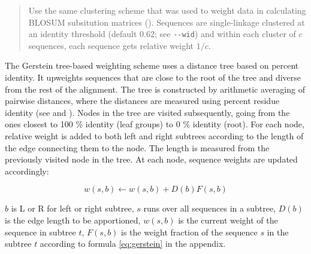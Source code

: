 \begin{quote}
	Use the same clustering scheme that was used to weight data in calculating
	BLOSUM subsitution matrices (\cite{henikoff1994}). Sequences are
	single-linkage clustered at an identity threshold (default 0.62; see
	\lstinline{--wid}) and within each cluster of $c$ sequences, each sequence
	gets relative weight $1/c$. 
\end{quote}

The Gerstein tree-based weighting scheme uses a distance tree based on percent
identity. It upweights sequences that are close to the root of the tree and
diverse from the rest of the alignment. The tree is constructed by arithmetic
averaging of pairwise distances, where the distances are measured using percent
residue identity (see \cite{nei1987} and \cite{sneath1973}). Nodes in the tree
are visited subsequently, going from the ones closest to 100 \% identity (leaf
groups) to 0 \% identity (root). For each node, relative weight is added to both
left and right subtrees according to the length of the edge connecting them to
the node. The length is measured from the previously visited node in the tree.
At each node, sequence weights are updated accordingly:

\begin{equation}
	w(s,b) \leftarrow w(s,b) + D(b)F(s,b)
	\label{eq:gerstein}
\end{equation}

$b$ is L or R for left or right subtree, $s$ runs over all sequences in a
subtree, $D(b)$ is the edge length to be apportioned, $w(s,b)$ is the current
weight of the sequence in subtree $t$, $F(s,b)$ is the weight fraction of the
sequence $s$ in the subtree $t$ according to formula \ref{eq:gerstein} in the
appendix.

